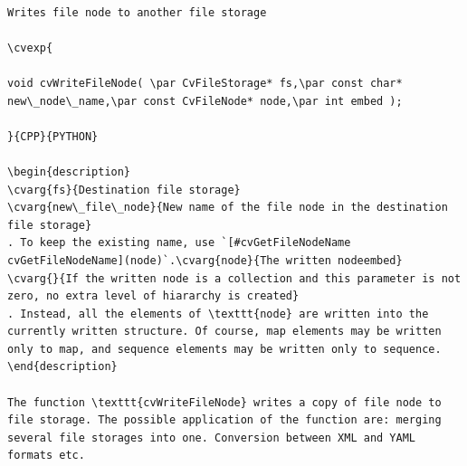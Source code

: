 \begin{verbatim}

Writes file node to another file storage

\cvexp{

void cvWriteFileNode( \par CvFileStorage* fs,\par const char* new\_node\_name,\par const CvFileNode* node,\par int embed );

}{CPP}{PYTHON}

\begin{description}
\cvarg{fs}{Destination file storage}
\cvarg{new\_file\_node}{New name of the file node in the destination file storage}
. To keep the existing name, use `[#cvGetFileNodeName cvGetFileNodeName](node)`.\cvarg{node}{The written nodeembed}
\cvarg{}{If the written node is a collection and this parameter is not zero, no extra level of hiararchy is created}
. Instead, all the elements of \texttt{node} are written into the currently written structure. Of course, map elements may be written only to map, and sequence elements may be written only to sequence.
\end{description}

The function \texttt{cvWriteFileNode} writes a copy of file node to file storage. The possible application of the function are: merging several file storages into one. Conversion between XML and YAML formats etc.


\end{verbatim}
